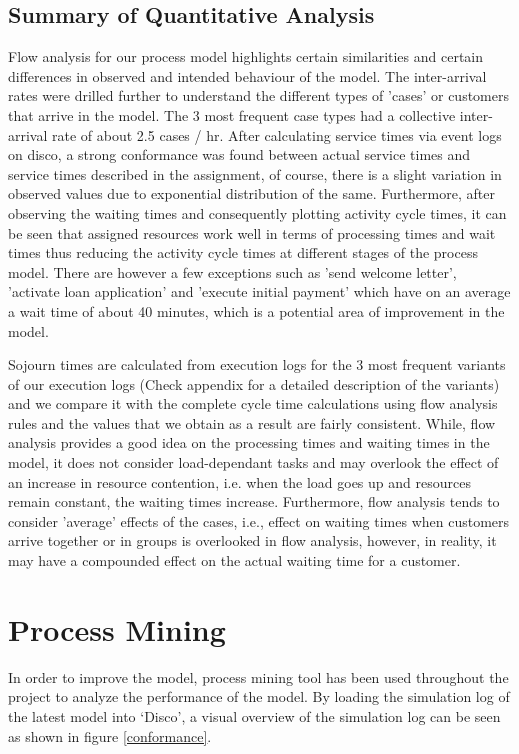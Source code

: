 \documentclass[a4paper]{article} %
\begin{document}
\subsection{Summary of Quantitative Analysis}
Flow analysis for our process model highlights certain similarities and certain differences in observed and intended behaviour of the model. The inter-arrival rates were drilled further to understand the different types of 'cases' or customers that arrive in the model. The 3 most frequent case types had a collective inter-arrival rate of about 2.5 cases / hr. After calculating service times via event logs on disco, a strong conformance was found between actual service times and service times described in the assignment, of course, there is a slight variation in observed values due to exponential distribution of the same. Furthermore, after observing the waiting times and consequently plotting activity cycle times, it can be seen that assigned resources work well in terms of processing times and wait times thus reducing the activity cycle times at different stages of the process model. There are however a few exceptions such as 'send welcome letter', 'activate loan application' and 'execute initial payment' which  have on an average a wait time of about 40 minutes, which is a potential area of improvement in the model. 

Sojourn times are calculated from execution logs for the 3 most frequent variants of our execution logs (Check appendix for a detailed description of the variants) and we compare it with the complete cycle time calculations using flow analysis rules and the values that we obtain as a result are fairly consistent. While, flow analysis provides a good idea on the processing times and waiting times in the model, it does not consider load-dependant tasks and may overlook the effect of an increase in resource contention, i.e. when the load goes up and resources remain constant, the waiting times increase. Furthermore, flow analysis tends to consider 'average' effects of the cases, i.e., effect on waiting times when customers arrive together or in groups is overlooked in flow analysis, however, in reality, it may have a compounded effect on the actual waiting time for a customer.

\section{Process Mining}
In order to improve the model, process mining  tool has been used throughout the project to analyze the performance of the model. By loading the simulation log of the latest model into ‘Disco’, a visual overview of the simulation log can be seen as shown in figure \ref{conformance}.
\end{document}
